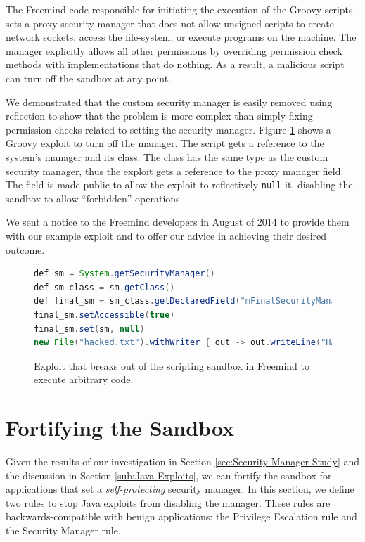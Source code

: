 \documentclass{sig-alternate}
\begin{document}
The Freemind code responsible for initiating the execution of the
Groovy scripts sets a proxy security manager that does not allow unsigned
scripts to create network sockets, access the file-system, or execute
programs on the machine. The manager explicitly allows all other permissions by overriding permission check methods with implementations that do nothing. As a result, a malicious script can turn off the sandbox at any point.

We demonstrated that the custom security manager is easily removed
using reflection to show that the problem is more complex than simply
fixing permission checks related to setting the security manager. Figure \ref{fig:Example-Exploit-for-Freemind}
shows a Groovy exploit to turn off the manager. The script gets a reference to the system's manager
and its class. The class has the same type as the custom security
manager, thus the exploit gets a reference to the proxy manager field.
The field is made public to allow the exploit to reflectively \texttt{null}
it, disabling the sandbox to allow ``forbidden'' operations.

We sent a notice to the Freemind developers in August of 2014 to provide
them with our example exploit and to offer our advice in achieving
their desired outcome. 

\begin{figure}
\begin{lstlisting}[language=Java,basicstyle={\scriptsize},breaklines=true]
def sm = System.getSecurityManager() 
def sm_class = sm.getClass() 
def final_sm = sm_class.getDeclaredField("mFinalSecurityManager")
final_sm.setAccessible(true) 
final_sm.set(sm, null)
new File("hacked.txt").withWriter { out -> out.writeLine("HACKED!") }
\end{lstlisting}


\caption{Exploit that breaks out of the scripting sandbox in Freemind\label{fig:Example-Exploit-for-Freemind}
to execute arbitrary code.}
\end{figure}

\section{ Fortifying the Sandbox}\label{sec:Rules-for-Fortifying}

Given the results of our investigation in Section \ref{sec:Security-Manager-Study}
and the discussion in Section \ref{sub:Java-Exploits}, we can fortify
the sandbox for applications that set a \emph{self-protecting} security
manager. In this section, we define two rules to stop Java exploits
from disabling the manager. These rules are backwards-compatible with
benign applications: the Privilege Escalation rule and the Security
Manager rule. 
\end{document}
